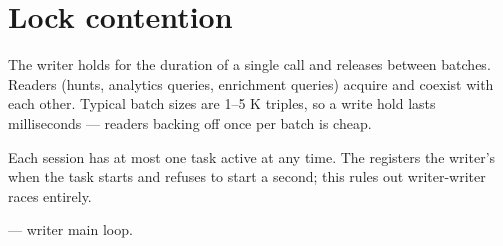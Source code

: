 \section{Lock contention}

The writer holds  for the duration of a single
 call and releases between batches.
Readers (hunts, analytics queries, enrichment queries) acquire
 and coexist with each other. Typical batch
sizes are 1--5 K triples, so a write hold lasts milliseconds ---
readers backing off once per batch is cheap.

\begin{invariant}
Each session has at most one  task active at any
time. The  registers the writer's
 when the task starts and refuses to start a
second; this rules out writer-writer races entirely.
\end{invariant}

\begin{inthecode}
 --- writer
main loop.
\end{inthecode}
